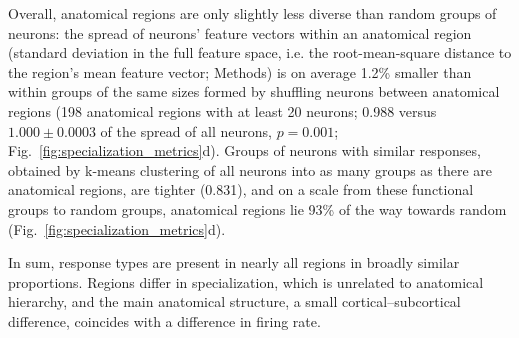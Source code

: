 \documentclass[10pt,lineno]{elife}
\begin{document}
Overall, anatomical regions are only slightly less diverse than random groups of neurons: the spread of neurons' feature vectors within an anatomical region (standard deviation in the full feature space, i.e. the root-mean-square distance to the region's mean feature vector; Methods) is on average 1.2\% smaller than within groups of the same sizes formed by shuffling neurons between anatomical regions (198 anatomical regions with at least 20 neurons; 0.988 versus $1.000\pm0.0003$ of the spread of all neurons, $p=0.001$; Fig.~\ref{fig:specialization_metrics}d). Groups of neurons with similar responses, obtained by k-means clustering of all neurons into as many groups as there are anatomical regions, are tighter (0.831), and on a scale from these functional groups to random groups, anatomical regions lie 93\% of the way towards random (Fig.~\ref{fig:specialization_metrics}d).

In sum, response types are present in nearly all regions in broadly similar proportions. Regions differ in specialization, which is unrelated to anatomical hierarchy, and the main anatomical structure, a small cortical--subcortical difference, coincides with a difference in firing rate.
\end{document}
